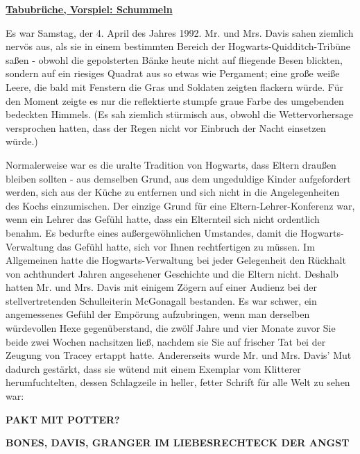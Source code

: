 

\hypertarget{tabubruxfcche-vorspiel-schummeln}{%

\textbf{\uline{Tabubrüche, Vorspiel: Schummeln}}

Es war Samstag, der 4. April des Jahres 1992. Mr. und Mrs. Davis sahen ziemlich nervös aus, als sie in einem bestimmten Bereich der Hogwarts-Quidditch-Tribüne saßen - obwohl die gepolsterten Bänke heute nicht auf fliegende Besen blickten, sondern auf ein riesiges Quadrat aus so etwas wie Pergament; eine große weiße Leere, die bald mit Fenstern die Gras und Soldaten zeigten flackern würde. Für den Moment zeigte es nur die reflektierte stumpfe graue Farbe des umgebenden bedeckten Himmels. (Es sah ziemlich stürmisch aus, obwohl die Wettervorhersage versprochen hatten, dass der Regen nicht vor Einbruch der Nacht einsetzen würde.)

Normalerweise war es die uralte Tradition von Hogwarts, dass Eltern draußen bleiben sollten - aus demselben Grund, aus dem ungeduldige Kinder aufgefordert werden, sich aus der Küche zu entfernen und sich nicht in die Angelegenheiten des Kochs einzumischen. Der einzige Grund für eine Eltern-Lehrer-Konferenz war, wenn ein Lehrer das Gefühl hatte, dass ein Elternteil sich nicht ordentlich benahm. Es bedurfte eines außergewöhnlichen Umstandes, damit die Hogwarts-Verwaltung das Gefühl hatte, sich vor Ihnen rechtfertigen zu müssen. Im Allgemeinen hatte die Hogwarts-Verwaltung bei jeder Gelegenheit den Rückhalt von achthundert Jahren angesehener Geschichte und die Eltern nicht. Deshalb hatten Mr. und Mrs. Davis mit einigem Zögern auf einer Audienz bei der stellvertretenden Schulleiterin McGonagall bestanden. Es war schwer, ein angemessenes Gefühl der Empörung aufzubringen, wenn man derselben würdevollen Hexe gegenüberstand, die zwölf Jahre und vier Monate zuvor Sie beide zwei Wochen nachsitzen ließ, nachdem sie Sie auf frischer Tat bei der Zeugung von Tracey ertappt hatte. Andererseits wurde Mr. und Mrs. Davis' Mut dadurch gestärkt, dass sie wütend mit einem Exemplar vom Klitterer herumfuchtelten, dessen Schlagzeile in heller, fetter Schrift für alle Welt zu sehen war:

\textbf{PAKT MIT POTTER?}

\textbf{BONES, DAVIS, GRANGER IM LIEBESRECHTECK DER ANGST}

}
